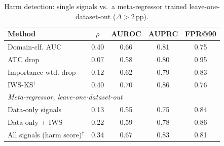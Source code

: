\documentclass[conference]{IEEEtran}
\theoremstyle{plainhead}
\newcommand{\pp}{\,pp\xspace}
\begin{document}
\begin{table}[t]
\centering
\caption{Harm detection: single signals vs.\ a meta-regressor trained leave-one-dataset-out ($\Delta>2$\pp).}
\label{tab:harm}
\footnotesize
\setlength{\tabcolsep}{4pt}
\begin{tabular}{lcccc}
\toprule
Method & $\rho$ & AUROC & AUPRC & FPR@90 \\
\midrule
Domain-clf. AUC & 0.40 & 0.66 & 0.81 & 0.75 \\
ATC drop & 0.07 & 0.58 & 0.80 & 0.95 \\
Importance-wtd. drop & 0.12 & 0.62 & 0.79 & 0.83 \\
IWS-KS$^\dagger$ & 0.40 & 0.70 & 0.86 & 0.76 \\
\midrule \multicolumn{5}{l}{\emph{Meta-regressor, leave-one-dataset-out}} \\
Data-only signals & 0.13 & 0.55 & 0.75 & 0.84 \\
Data-only + IWS & 0.22 & 0.59 & 0.78 & 0.86 \\
All signals (harm score)$^\dagger$ & 0.34 & 0.67 & 0.83 & 0.81 \\
\bottomrule
\end{tabular}
\end{table}
\end{document}
